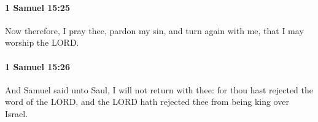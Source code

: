 		\paragraph{1 Samuel 15:25} %
			\label{1SAMUEL-15-25}

			Now therefore, I pray thee, pardon my sin, and turn again with me, that I may worship the LORD.


		\paragraph{1 Samuel 15:26} %
			\label{1SAMUEL-15-26}

			And Samuel said unto Saul, I will not return with thee: for thou hast rejected the word of the LORD, and the LORD hath rejected thee from being king over Israel.


